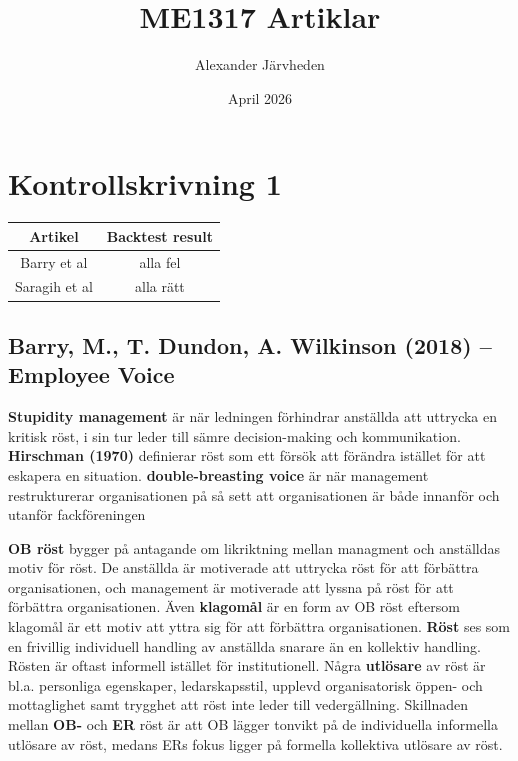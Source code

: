 \documentclass{report}
\title{ME1317 Artiklar}
\author{Alexander Järvheden}
\date{April 2026}
\begin{document}
	\maketitle
	\chapter{Kontrollskrivning 1}
	\begin{table}[ht!]
		\centering
		\Large
		\begin{tabular}{c|c}
			\toprule Artikel     & Backtest result \\
			\midrule Barry et al & alla fel        \\
			Saragih et al        & alla rätt
		\end{tabular}
	\end{table}

	\newpage
	\section{Barry, M., T. Dundon, A. Wilkinson (2018) -- Employee
	Voice}
	\textbf{Stupidity management} är när ledningen förhindrar
	anställda att uttrycka en kritisk röst, i sin tur leder till
	sämre decision-making och kommunikation. \textbf{Hirschman
	(1970)} definierar röst som ett försök att förändra istället
	för att eskapera en situation. \textbf{double-breasting
	voice} är när management restrukturerar organisationen på så
	sett att organisationen är både innanför och utanför fackföreningen

	\textbf{OB röst} bygger på antagande om likriktning mellan managment
	och anställdas motiv för röst. De anställda är motiverade
	att uttrycka röst för att förbättra organisationen, och management
	är motiverade att lyssna på röst för att förbättra organisationen.
	Även \textbf{klagomål} är en form av OB röst eftersom klagomål
	är ett motiv att yttra sig för att förbättra organisationen.
	\textbf{Röst} ses som en frivillig individuell handling av anställda
	snarare än en kollektiv handling. Rösten är oftast
	informell istället för institutionell. Några \textbf{utlösare}
	av röst är bl.a. personliga egenskaper, ledarskapsstil, upplevd
	organisatorisk öppen- och mottaglighet samt trygghet att
	röst inte leder till vedergällning. Skillnaden mellan \textbf{OB-}
	och \textbf{ER} röst är att OB lägger tonvikt på de individuella
	informella utlösare av röst, medans ERs fokus ligger på
	formella kollektiva utlösare av röst.
\end{document}

